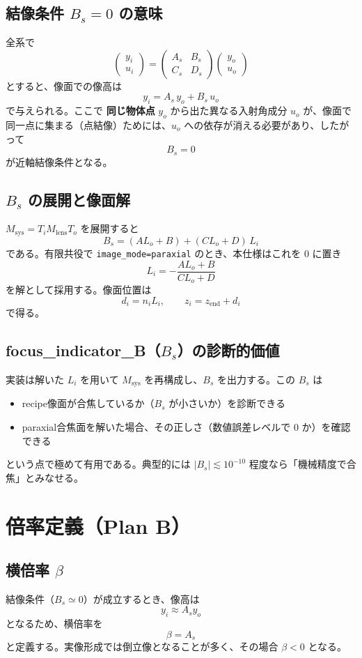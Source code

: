 \subsection{結像条件 $B_s=0$ の意味}
全系で
\[
\begin{pmatrix}y_i\\u_i\end{pmatrix}
=
\begin{pmatrix}A_s&B_s\\C_s&D_s\end{pmatrix}
\begin{pmatrix}y_o\\u_o\end{pmatrix}
\]
とすると、像面での像高は
\[
y_i = A_s\,y_o + B_s\,u_o
\]
で与えられる。ここで \textbf{同じ物体点} $y_o$ から出た異なる入射角成分 $u_o$ が、像面で同一点に集まる（点結像）ためには、$u_o$ への依存が消える必要があり、したがって
\[
\boxed{B_s = 0}
\]
が近軸結像条件となる。

\subsection{$B_s$ の展開と像面解}
$M_{\mathrm{sys}}=T_i M_{\mathrm{lens}} T_o$ を展開すると
\[
B_s = (A L_o + B) + (C L_o + D)\,L_i
\]
である。有限共役で \texttt{image\_mode=paraxial} のとき、本仕様はこれを 0 に置き
\[
\boxed{
L_i = -\frac{A L_o + B}{C L_o + D}
}
\]
を解として採用する。像面位置は
\[
d_i = n_i L_i,
\qquad
\boxed{z_i = z_{\mathrm{end}} + d_i}
\]
で得る。

\subsection{focus\_indicator\_B（$B_s$）の診断的価値}
実装は解いた $L_i$ を用いて $M_{\mathrm{sys}}$ を再構成し、$B_s$ を出力する。この $B_s$ は
\begin{itemize}
  \item recipe像面が合焦しているか（$B_s$ が小さいか）を診断できる
  \item paraxial合焦面を解いた場合、その正しさ（数値誤差レベルで 0 か）を確認できる
\end{itemize}
という点で極めて有用である。典型的には $|B_s|\lesssim 10^{-10}$ 程度なら「機械精度で合焦」とみなせる。

\section{倍率定義（Plan B）}

\subsection{横倍率 $\beta$}
結像条件（$B_s\simeq 0$）が成立するとき、像高は
\[
y_i \approx A_s y_o
\]
となるため、横倍率を
\[
\boxed{\beta = A_s}
\]
と定義する。実像形成では倒立像となることが多く、その場合 $\beta<0$ となる。

